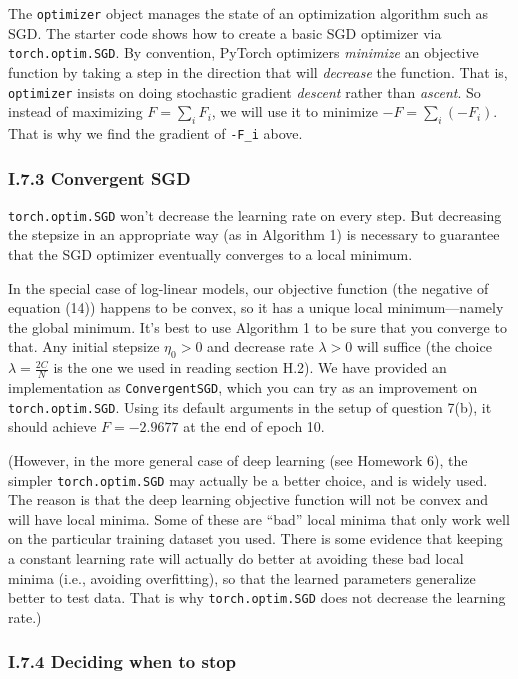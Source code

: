 \documentclass[12pt]{article}
\theoremstyle{plain}
\theoremstyle{definition}
\theoremstyle{remark}
\begin{document}
The \texttt{optimizer} object manages the state of an optimization algorithm such as SGD. The starter code shows how to create a basic SGD optimizer via \texttt{torch.optim.SGD}. By convention, PyTorch optimizers \emph{minimize} an objective function by taking a step in the direction that will \emph{decrease} the function. That is, \texttt{optimizer} insists on doing stochastic gradient \emph{descent} rather than \emph{ascent}. So instead of maximizing $F = \sum_i F_i$, we will use it to minimize $-F = \sum_i (-F_i)$. That is why we find the gradient of \texttt{-F\_i} above.

\subsubsection*{I.7.3 Convergent SGD}

\texttt{torch.optim.SGD} won’t decrease the learning rate on every step. But decreasing the stepsize in an appropriate way (as in Algorithm 1) is necessary to guarantee that the SGD optimizer eventually converges to a local minimum.

In the special case of log-linear models, our objective function (the negative of equation (14)) happens to be convex, so it has a unique local minimum—namely the global minimum. It’s best to use Algorithm 1 to be sure that you converge to that. Any initial stepsize $\eta_0 > 0$ and decrease rate $\lambda > 0$ will suffice (the choice $\lambda = \tfrac{2C}{N}$ is the one we used in reading section H.2). We have provided an implementation as \texttt{ConvergentSGD}, which you can try as an improvement on \texttt{torch.optim.SGD}. Using its default arguments in the setup of question 7(b), it should achieve $F = -2.9677$ at the end of epoch 10.

(However, in the more general case of deep learning (see Homework 6), the simpler \texttt{torch.optim.SGD} may actually be a better choice, and is widely used. The reason is that the deep learning objective function will not be convex and will have local minima. Some of these are “bad” local minima that only work well on the particular training dataset you used. There is some evidence that keeping a constant learning rate will actually do better at avoiding these bad local minima (i.e., avoiding overfitting), so that the learned parameters generalize better to test data. That is why \texttt{torch.optim.SGD} does not decrease the learning rate.)

\subsubsection*{I.7.4 Deciding when to stop}
\end{document}
